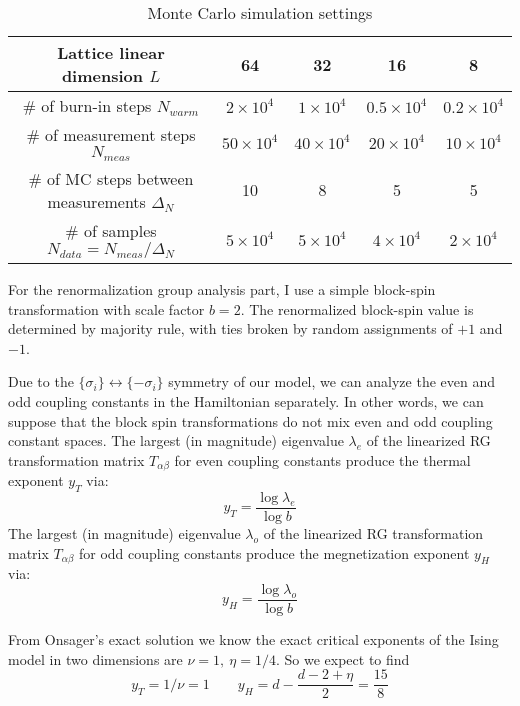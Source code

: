 \documentclass{article}
\begin{document}
\begin{table}[H]
\centering
\begin{tabular}{|c|c|c|c|c|} 
 \hline
 Lattice linear dimension $L$ & 64 & 32 & 16 & 8 \\ 
 \hline
 \# of burn-in steps $N_{warm}$ & $2\times 10^4$& $1\times 10^4$& $0.5\times 10^4$& $0.2\times 10^4$ \\ 
 \hline
 \# of measurement steps $N_{meas}$& $50\times 10^4$& $40\times 10^4$& $20\times 10^4$& $10\times 10^4$\\
 \hline
 \# of MC steps between measurements $\Delta_N$ & 10 & 8 & 5 & 5 \\
 \hline
 \# of samples $N_{data} = N_{meas}/\Delta_{N}$ & $5\times 10^4$& $5\times 10^4$& $4\times 10^4$& $2\times 10^4$ \\
 \hline
 \end{tabular}
 \caption{\label{MCSettings}Monte Carlo simulation settings}
\end{table}

For the renormalization group analysis part, I use a simple block-spin transformation with scale factor $b = 2$. The renormalized block-spin value is determined by majority rule, with ties broken by random assignments of $+1$ and $-1$.  


Due to the $\{\sigma_i\} \leftrightarrow \{-\sigma_i\}$ symmetry of our model, we can analyze the even and odd coupling constants in the Hamiltonian separately. In other words, we can suppose that the block spin transformations do not mix even and odd coupling constant spaces. The largest (in magnitude) eigenvalue $\lambda_e$ of the linearized RG transformation matrix $T_{\alpha\beta}$ for even coupling constants produce the thermal exponent $y_T$ via:
\begin{equation}
y_T = \frac{\log \lambda_e}{\log b}
\end{equation}
The largest (in magnitude) eigenvalue $\lambda_o$ of the linearized RG transformation matrix $T_{\alpha\beta}$ for odd coupling constants  produce the megnetization exponent $y_H$ via:
\begin{equation}
y_H = \frac{\log \lambda_o}{\log b}
\end{equation}

From Onsager's exact solution \cite{Onsager1944} we know the exact critical exponents of the Ising model in two dimensions are $\nu = 1 ,\  \eta = 1/4$. So we expect to find
\begin{equation*}
y_T = 1/\nu = 1 \qquad y_H = d-\frac{d-2+\eta}{2}= \frac{15}{8}
\end{equation*}
\end{document}
